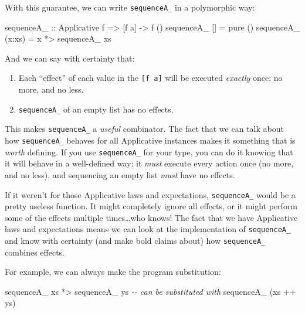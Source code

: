 \documentclass[]{article}
\newenvironment{Shaded}{}{}
\newcommand{\CommentTok}[1]{\textcolor[rgb]{0.38,0.63,0.69}{\textit{#1}}}
\newcommand{\DataTypeTok}[1]{\textcolor[rgb]{0.56,0.13,0.00}{#1}}
\newcommand{\FunctionTok}[1]{\textcolor[rgb]{0.02,0.16,0.49}{#1}}
\newcommand{\NormalTok}[1]{#1}
\newcommand{\OperatorTok}[1]{\textcolor[rgb]{0.40,0.40,0.40}{#1}}
\newcommand{\OtherTok}[1]{\textcolor[rgb]{0.00,0.44,0.13}{#1}}
\begin{document}
With this guarantee, we can write \texttt{sequenceA\_} in a polymorphic way:

\begin{Shaded}
\begin{Highlighting}[]
\OtherTok{sequenceA\_ ::} \DataTypeTok{Applicative}\NormalTok{ f }\OtherTok{=\textgreater{}}\NormalTok{ [f a] }\OtherTok{{-}\textgreater{}}\NormalTok{ f ()}
\NormalTok{sequenceA\_ []     }\OtherTok{=} \FunctionTok{pure}\NormalTok{ ()}
\NormalTok{sequenceA\_ (x}\OperatorTok{:}\NormalTok{xs) }\OtherTok{=}\NormalTok{ x }\OperatorTok{*\textgreater{}}\NormalTok{ sequenceA\_ xs}
\end{Highlighting}
\end{Shaded}

And we can say with certainty that:

\begin{enumerate}
\def\labelenumi{\arabic{enumi}.}
\tightlist
\item
  Each ``effect'' of each value in the \texttt{{[}f\ a{]}} will be executed
  \emph{exactly} once: no more, and no less.
\item
  \texttt{sequenceA\_} of an empty list has no effects.
\end{enumerate}

This makes \texttt{sequenceA\_} a \emph{useful} combinator. The fact that we can
talk about how \texttt{sequenceA\_} behaves for all Applicative instances makes
it something that is \emph{worth} defining. If you use \texttt{sequenceA\_} for
your type, you can do it knowing that it will behave in a well-defined way: it
\emph{must} execute every action once (no more, and no less), and sequencing an
empty list \emph{must} have no effects.

If it weren't for those Applicative laws and expectations, \texttt{sequenceA\_}
would be a pretty useless function. It might completely ignore all effects, or
it might perform some of the effects multiple times\ldots who knows! The fact
that we have Applicative laws and expectations means we can look at the
implementation of \texttt{sequenceA\_} and know with certainty (and make bold
claims about) how \texttt{sequenceA\_} combines effects.

For example, we can always make the program substitution:

\begin{Shaded}
\begin{Highlighting}[]
\NormalTok{sequenceA\_ xs }\OperatorTok{*\textgreater{}}\NormalTok{ sequenceA\_ ys}
\CommentTok{{-}{-} can be substituted with}
\NormalTok{sequenceA\_ (xs }\OperatorTok{++}\NormalTok{ ys)}
\end{Highlighting}
\end{Shaded}
\end{document}

